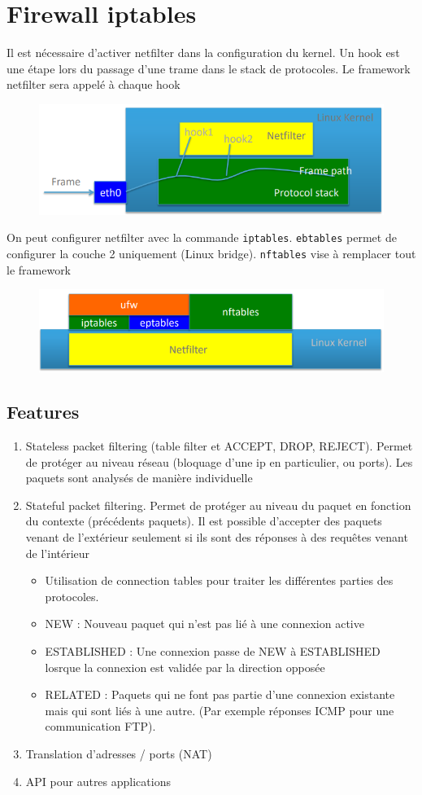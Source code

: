 \documentclass[resume]{subfiles}
\begin{document}
\section{Firewall iptables}
Il est nécessaire d'activer netfilter dans la configuration du kernel. Un hook est une étape lors du passage d'une trame dans le stack de protocoles. Le framework netfilter sera appelé à chaque hook
\begin{figure}[H]
\centering
\includegraphics[width=0.7\columnwidth]{img_6.png}
\end{figure}
On peut configurer netfilter avec la commande \verb!iptables!. \verb!ebtables! permet de configurer la couche 2 uniquement (Linux bridge). \verb!nftables! vise à remplacer tout le framework
\begin{figure}[H]
\centering
\includegraphics[width=0.6\columnwidth]{img_7.png}
\end{figure}
\subsection{Features}
\begin{enumerate}
\item Stateless packet filtering (table filter et ACCEPT, DROP, REJECT). Permet de protéger au niveau réseau (bloquage d'une ip en particulier, ou ports). Les paquets sont analysés de manière individuelle
\item Stateful packet filtering. Permet de protéger au niveau du paquet en fonction du contexte (précédents paquets). Il est possible d'accepter des paquets venant de l'extérieur seulement si ils sont des réponses à des requêtes venant de l'intérieur
\begin{itemize}
\item Utilisation de connection tables pour traiter les différentes parties des protocoles.
\item NEW : Nouveau paquet qui n'est pas lié à une connexion active
\item ESTABLISHED : Une connexion passe de NEW à ESTABLISHED losrque la connexion est validée par la direction opposée
\item RELATED : Paquets qui ne font pas partie d'une connexion existante mais qui sont liés à une autre. (Par exemple réponses ICMP pour une communication FTP).
\end{itemize}
\item Translation d'adresses / ports (NAT)
\item API pour autres applications
\end{enumerate}
\end{document}
